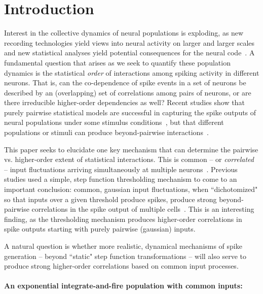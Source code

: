 \documentclass[%
 reprint,
 twocolumn,
 amsmath,amssymb,
 aps,
floatfix,
]{revtex4}
\begin{document}
\section{\label{sec:intro}Introduction}%

Interest in the collective dynamics of neural populations is exploding, as new recording technologies yield views into neural activity on larger and larger scales~\cite{shlens, another review} and new statistical  analyses yield potential consequences for the neural code~\cite{pillow,ganmor,kass review,joel review}.  A fundamental question that arises as we seek to quantify these population dynamics is the statistical {\it order} of interactions among spiking activity in different neurons.  That is, can the co-dependence of spike events in a set of neurons be described by an (overlapping) set of correlations among pairs of neurons, or are there irreducible higher-order dependencies as well?  Recent studies show that purely pairwise statistical models are successful in capturing the spike outputs of neural populations under some stimulus conditions~\cite{schneidman06,shlens06,shlens09}, but that different populations or stimuli can produce beyond-pairwise interactions~\cite{victor,ganmor,montani,yu}.

This paper seeks to elucidate one key mechanism that can determine the pairwise vs. higher-order extent of statistical interactions.  This is common -- or {\it correlated} -- input fluctuations arriving simultaneously at multiple neurons~\cite{shadnew08,binpowers,tr08}.  Previous studies used a simple, step function thresholding mechanism to come to an important conclusion:  common, gaussian input fluctuations, when ``dichotomized" so that inputs over a given threshold produce spikes, produce strong beyond-pairwise correlations in the spike output of multiple cells~\cite{macke11,Amarietal03}.  This is an interesting finding, as the thresholding mechanism produces higher-order correlations in spike outputs starting with purely pairwise (gaussian) inputs.  

A natural question is whether more realistic, dynamical mechanisms of spike generation -- beyond ``static" step function transformations -- will also serve to produce strong higher-order correlations based on common input processes.  

\bigskip

\noindent \paragraph*{An exponential integrate-and-fire population with common inputs:}
\end{document}
